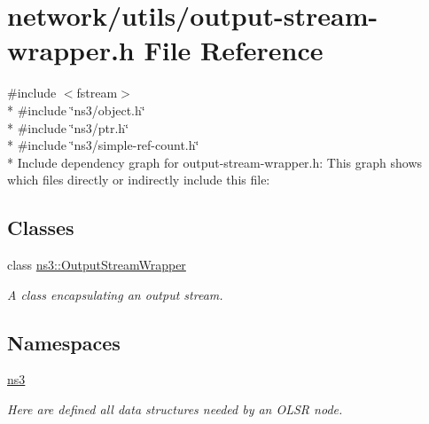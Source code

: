 \hypertarget{output-stream-wrapper_8h}{}\section{network/utils/output-\/stream-\/wrapper.h File Reference}
\label{output-stream-wrapper_8h}
{\ttfamily \#include $<$fstream$>$}\\*
{\ttfamily \#include \char`\"{}ns3/object.\+h\char`\"{}}\\*
{\ttfamily \#include \char`\"{}ns3/ptr.\+h\char`\"{}}\\*
{\ttfamily \#include \char`\"{}ns3/simple-\/ref-\/count.\+h\char`\"{}}\\*
Include dependency graph for output-\/stream-\/wrapper.h\+:
This graph shows which files directly or indirectly include this file\+:
\subsection*{Classes}
\begin{DoxyCompactItemize}
\item 
class \hyperlink{classns3_1_1OutputStreamWrapper}{ns3\+::\+Output\+Stream\+Wrapper}
\begin{DoxyCompactList}\small\item\em A class encapsulating an output stream. \end{DoxyCompactList}\end{DoxyCompactItemize}
\subsection*{Namespaces}
\begin{DoxyCompactItemize}
\item 
 \hyperlink{namespacens3}{ns3}
\begin{DoxyCompactList}\small\item\em Here are defined all data structures needed by an O\+L\+SR node. \end{DoxyCompactList}\end{DoxyCompactItemize}
